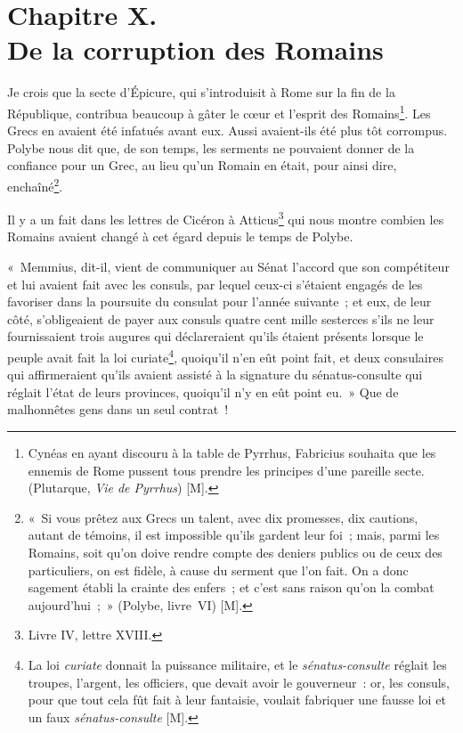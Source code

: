 \documentclass[french,twoside]{book} %
\newcommand\chapteropen{} %
\newcommand\chaptercont{} %
\begin{document}
\chapteropen
\chapter[{Chapitre X. De la corruption des Romains}]{Chapitre X. \\
De la corruption des Romains}
\label{considérations\_Romains\_chap\_10}\renewcommand{\leftmark}{Chapitre X. \\
De la corruption des Romains}


\chaptercont
\noindent Je crois que la secte d’Épicure, qui s’introduisit à Rome sur la fin de la République, contribua beaucoup à gâter le cœur et l’esprit des Romains\footnote{Cynéas en ayant discouru à la table de Pyrrhus, Fabricius souhaita que les ennemis de Rome pussent tous prendre les principes d’une pareille secte. (Plutarque, {\itshape Vie de Pyrrhus}) [M].}. Les Grecs en avaient été infatués avant eux. Aussi avaient-ils été plus tôt corrompus. Polybe nous dit que, de son temps, les serments ne pouvaient donner de la confiance pour un Grec, au lieu qu’un Romain en était, pour ainsi dire, enchaîné\footnote{« Si vous prêtez aux Grecs un talent, avec dix promesses, dix cautions, autant de témoins, il est impossible qu’ils gardent leur foi ; mais, parmi les Romains, soit qu’on doive rendre compte des deniers publics ou de ceux des particuliers, on est fidèle, à cause du serment que l’on fait. On a donc sagement établi la crainte des enfers ; et c’est sans raison qu’on la combat aujourd’hui ; » (Polybe, livre VI) [M].}.\par
Il y a un fait dans les lettres de Cicéron à Atticus\footnote{Livre IV, lettre XVIII.} qui nous montre combien les Romains avaient changé à cet égard depuis le temps de Polybe.\par
« Memmius, dit-il, vient de communiquer au Sénat l’accord que son compétiteur et lui avaient fait avec les consuls, par lequel ceux-ci s’étaient engagés de les favoriser dans la poursuite du consulat pour l’année suivante ; et eux, de leur côté, s’obligeaient de payer aux consuls quatre cent mille sesterces s’ils ne leur fournissaient trois augures qui déclareraient qu’ils étaient présents lorsque le peuple avait fait la loi curiate\footnote{La loi {\itshape curiate} donnait la puissance militaire, et le {\itshape sénatus-consulte} réglait les troupes, l’argent, les officiers, que devait avoir le gouverneur : or, les consuls, pour que tout cela fût fait à leur fantaisie, voulait fabriquer une fausse loi et un faux {\itshape sénatus-consulte} [M].}, quoiqu’il n’en eût point fait, et deux consulaires qui affirmeraient qu’ils avaient assisté à la signature du sénatus-consulte qui réglait l’état de leurs provinces, quoiqu’il n’y en eût point eu. » Que de malhonnêtes gens dans un seul contrat !\par
\end{document}
